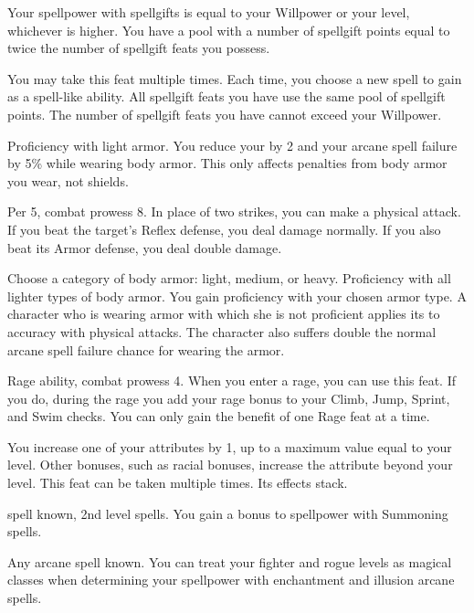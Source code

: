 Your spellpower with spellgifts is equal to your Willpower or your level, whichever is higher.
You have a pool with a number of spellgift points equal to twice the number of spellgift feats you possess.

You may take this feat multiple times.
Each time, you choose a new spell to gain as a spell-like ability.
All spellgift feats you have use the same pool of spellgift points.
The number of spellgift feats you have cannot exceed your Willpower.

\featpre Proficiency with light armor.
\featben You reduce your  by 2 and your arcane spell failure by 5\% while wearing body armor.
This only affects penalties from body armor you wear, not shields.

\featpres Per 5, combat prowess 8.
\featben In place of two strikes, you can make a physical attack.
If you beat the target's Reflex defense, you deal damage normally.
If you also beat its Armor defense, you deal double damage.

Choose a category of body armor: light, medium, or heavy.
\featpre Proficiency with all lighter types of body armor.
\featben You gain proficiency with your chosen armor type.
A character who is wearing armor with which she is not proficient applies its  to accuracy with physical attacks.
The character also suffers double the normal arcane spell failure chance for wearing the armor.

\featpres Rage ability, combat prowess 4.
\featben When you enter a rage, you can use this feat. If you do, during the rage you add your rage bonus to your Climb, Jump, Sprint, and Swim checks.
 You can only gain the benefit of one Rage feat at a time.

\featben You increase one of your attributes by 1, up to a maximum value equal to your level.
Other bonuses, such as racial bonuses, increase the attribute beyond your level.
 This feat can be taken multiple times. Its effects stack.

\featpres {} spell known, 2nd level spells.
\featben You gain a  bonus to spellpower with Summoning spells.

\featpre Any arcane spell known.
\featben You can treat your fighter and rogue levels as magical classes when determining your spellpower with enchantment and illusion arcane spells.


